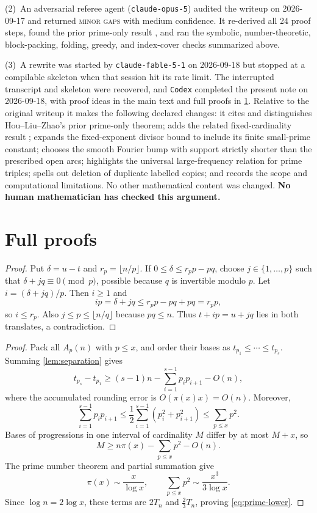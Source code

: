 \documentclass[11pt,a4paper]{article}
\theoremstyle{plain}
\theoremstyle{definition}
\theoremstyle{remark}
\begin{document}
(2)~An adversarial referee agent (\texttt{claude-opus-5}) audited the writeup on 2026-09-17 and returned \textsc{minor gaps} with medium confidence. It re-derived all 24 proof steps, found the prior prime-only result \cite{HLZ26}, and ran the symbolic, number-theoretic, block-packing, folding, greedy, and index-cover checks summarized above.

(3)~A rewrite was started by \texttt{claude-fable-5-1} on 2026-09-18 but stopped at a compilable skeleton when that session hit its rate limit. The interrupted transcript and skeleton were recovered, and \texttt{Codex} completed the present note on 2026-09-18, with proof ideas in the main text and full proofs in \cref{app:proofs}. Relative to the original writeup it makes the following declared changes: it cites and distinguishes Hou--Liu--Zhao's prior prime-only theorem; adds the related fixed-cardinality result \cite{MWWY26}; expands the fixed-exponent divisor bound to include its finite small-prime constant; chooses the smooth Fourier bump with support strictly shorter than the prescribed open arcs; highlights the universal large-frequency relation for prime triples; spells out deletion of duplicate labelled copies; and records the scope and computational limitations. No other mathematical content was changed. \textbf{No human mathematician has checked this argument.}

\appendix

\section{Full proofs}\label{app:proofs}

\label{pf:separation}
\lemseparation*
\begin{proof}
Put $\delta=u-t$ and $r_p=\lfloor n/p\rfloor$. If $0\le\delta\le r_pp-pq$, choose $j\in\{1,\ldots,p\}$ such that $\delta+jq\equiv0\pmod p$, possible because $q$ is invertible modulo $p$. Let $i=(\delta+jq)/p$. Then $i\ge1$ and
\[
 ip=\delta+jq\le r_pp-pq+pq=r_pp,
\]
so $i\le r_p$. Also $j\le p\le\lfloor n/q\rfloor$ because $pq\le n$. Thus $t+ip=u+jq$ lies in both translates, a contradiction.
\end{proof}

\label{pf:lower}
\proplower*
\begin{proof}
Pack all $A_p(n)$ with $p\le x$, and order their bases as $t_{p_1}\le\cdots\le t_{p_s}$. Summing \cref{lem:separation} gives
\[
 t_{p_s}-t_{p_1}
 \ge(s-1)n-\sum_{i=1}^{s-1}p_ip_{i+1}-O(n),
\]
where the accumulated rounding error is $O(\pi(x)x)=O(n)$. Moreover,
\[
 \sum_{i=1}^{s-1}p_ip_{i+1}
 \le\frac12\sum_{i=1}^{s-1}(p_i^2+p_{i+1}^2)
 \le\sum_{p\le x}p^2.
\]
Bases of progressions in one interval of cardinality $M$ differ by at most $M+x$, so
\[
 M\ge n\pi(x)-\sum_{p\le x}p^2-O(n).
\]
The prime number theorem and partial summation \cite[Chs.~XXII--XXIII]{HW08} give
\[
 \pi(x)\sim\frac{x}{\log x},\qquad
 \sum_{p\le x}p^2\sim\frac{x^3}{3\log x}.
\]
Since $\log n=2\log x$, these terms are $2T_n$ and $\frac23T_n$, proving \eqref{eq:prime-lower}.
\end{proof}
\end{document}
